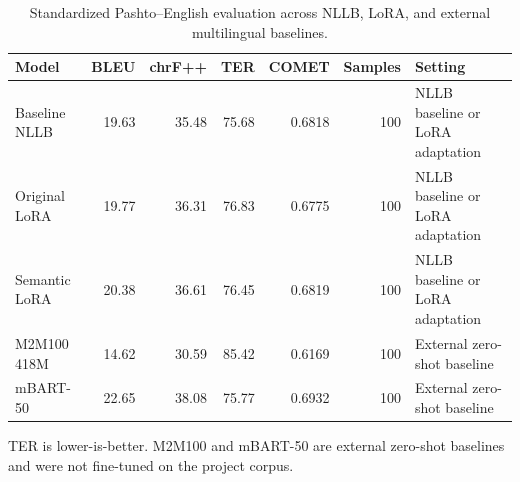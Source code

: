 \begin{table}[t]
\centering
\caption{Standardized Pashto--English evaluation across NLLB, LoRA, and external multilingual baselines.}
\label{tab:extended-model-comparison}
\small
\begin{tabular}{lrrrrrl}
\toprule
\textbf{Model} & \textbf{BLEU} & \textbf{chrF++} & \textbf{TER} & \textbf{COMET} & \textbf{Samples} & \textbf{Setting} \\
\midrule
Baseline NLLB & 19.63 & 35.48 & 75.68 & 0.6818 & 100 & NLLB baseline or LoRA adaptation \\
Original LoRA & 19.77 & 36.31 & 76.83 & 0.6775 & 100 & NLLB baseline or LoRA adaptation \\
Semantic LoRA & 20.38 & 36.61 & 76.45 & 0.6819 & 100 & NLLB baseline or LoRA adaptation \\
M2M100 418M & 14.62 & 30.59 & 85.42 & 0.6169 & 100 & External zero-shot baseline \\
mBART-50 & 22.65 & 38.08 & 75.77 & 0.6932 & 100 & External zero-shot baseline \\
\bottomrule
\end{tabular}
\vspace{2pt}\parbox{0.95\textwidth}{\footnotesize TER is lower-is-better. M2M100 and mBART-50 are external zero-shot baselines and were not fine-tuned on the project corpus.}
\end{table}
